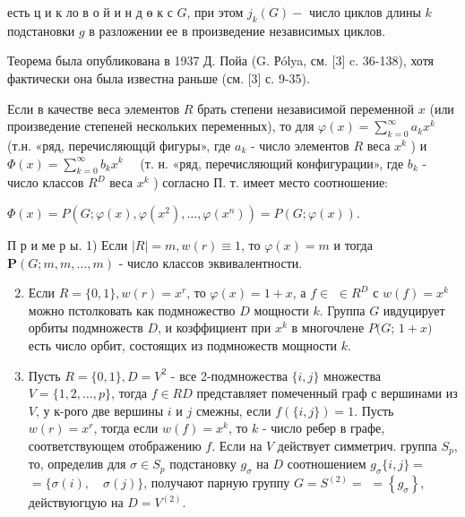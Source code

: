 \documentclass[10pt]{article}
\begin{document}
есть ц и к ло в о й и н д ө к с $G$, при этом $j_{k}(G)-$ число циклов длины $k$ подстановки $g$ в разложении ее в произведение независимых циклов.



Теорема была опубликована в 1937 Д. Пойа (G. Рólya, см. [3] c. 36-138), хотя фактически она была известна раньше (см. [3] с. 9-35).



Если в качестве веса элементов $R$ брать степени независимой переменной $x$ (или произведение степеней нескольких переменных), то для $\varphi(x)=\sum_{k=0}^{\infty} a_{k} x^{k}$ (т.н. «ряд, перечисляющцй фигуры», где $a_{k}$ - число элементов $R$ веса $x^{k}$ ) и $\Phi(x)=\sum_{k=0}^{\infty} b_{k} x^{k} \quad$ (т. н. «ряд, перечисляющий конфигурации», где $b_{k}$ - число классов $R^{D}$ веса $x^{k}$ ) согласно П. т. имеет место соотношение:



$\Phi(x)=P\left(G ; \varphi(x), \varphi\left(x^{2}\right), \ldots, \varphi\left(x^{n}\right)\right)=P(G ; \varphi(x))$.



П р и ме р ы. 1) Если $|R|=m, w(r) \equiv 1$, то $\varphi(x)=m$ и тогда $\boldsymbol{P}(G ; m, m, \ldots, m)$ - число классов эквивалентности.



\begin{enumerate}

  \setcounter{enumi}{1}

  \item Если $R=\{0,1\}, w(r)=x^{r}$, то $\varphi(x)=1+x$, а $f \in$ $\in R^{D}$ с $w(f)=x^{k}$ можно пстолковать как подмножество $D$ мощности $k$. Группа $G$ ивдуцирует орбиты подмножеств $D$, и козффициент при $x^{k}$ в многочлене $P(G$; $1+x)$ есть число орбит, состоящих из подмножеств мощности $k$.



  \item Пусть $R=\{0,1\}, D=V^{2}$ - все 2-подмножества $\{i, j\}$ множества $V=\{1,2, \ldots, p\}$, тогда $f \in R D$ представляет помеченный граф с вершинами из $V$, у к-рого две вершины $i$ и $j$ смежны, если $f(\{i, j\})=1$. Пусть $w(r)=x^{r}$, тогда если $w(f)=x^{k}$, то $k$ - число ребер в графе, соответствующем отображению $f$. Если на $V$ действует симметрич. группа $S_{p}$, то, определив для $\sigma \in S_{p}$ подстановку $g_{\sigma}$ на $D$ соотношением $g_{\sigma}\{i, j\}=$ $=\{\sigma(i), \quad \sigma(j)\}$, получают парную группу $G=S^{(2)}=$ $=\left\{g_{\sigma}\right\}$, действуюгцую на $D=V^{(2)}$.



\end{enumerate}
\end{document}
